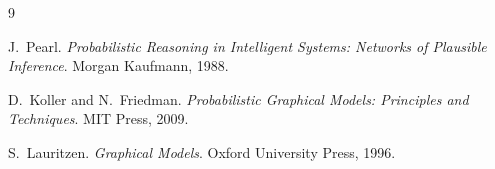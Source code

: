 \documentclass[11pt]{article}
\begin{document}

\begin{thebibliography}{9}

J.~Pearl.
\newblock \emph{Probabilistic Reasoning in Intelligent Systems: Networks of Plausible Inference}.
\newblock Morgan Kaufmann, 1988.

D.~Koller and N.~Friedman.
\newblock \emph{Probabilistic Graphical Models: Principles and Techniques}.
\newblock MIT Press, 2009.

S.~Lauritzen.
\newblock \emph{Graphical Models}.
\newblock Oxford University Press, 1996.

\end{thebibliography}
\end{document}

